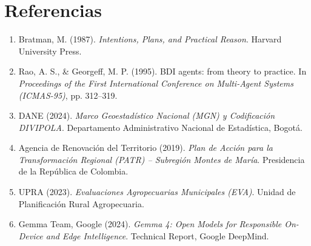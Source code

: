 \documentclass[11pt,a4paper]{article}
\begin{document}
\section{Referencias}
\begin{enumerate}[leftmargin=*]
    \item Bratman, M. (1987). \textit{Intentions, Plans, and Practical Reason}. Harvard University Press.
    \item Rao, A. S., \& Georgeff, M. P. (1995). BDI agents: from theory to practice. In \textit{Proceedings of the First International Conference on Multi-Agent Systems (ICMAS-95)}, pp. 312--319.
    \item DANE (2024). \textit{Marco Geoestadístico Nacional (MGN) y Codificación DIVIPOLA}. Departamento Administrativo Nacional de Estadística, Bogotá.
    \item Agencia de Renovación del Territorio (2019). \textit{Plan de Acción para la Transformación Regional (PATR) -- Subregión Montes de María}. Presidencia de la República de Colombia.
    \item UPRA (2023). \textit{Evaluaciones Agropecuarias Municipales (EVA)}. Unidad de Planificación Rural Agropecuaria.
    \item Gemma Team, Google (2024). \textit{Gemma 4: Open Models for Responsible On-Device and Edge Intelligence}. Technical Report, Google DeepMind.
\end{enumerate}
\end{document}
